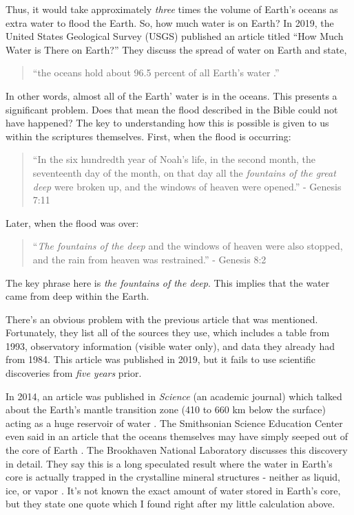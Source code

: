\documentclass[10pt]{article}
\begin{document}
\begin{multicols}{2}
Thus, it would take approximately \textit{three} times the volume of Earth's oceans as extra water to flood the Earth. So, how much water is on Earth? In 2019, the United States Geological Survey (USGS) published an article titled ``How Much Water is There on Earth?'' They discuss the spread of water on Earth and state,
\begin{quotation}
\noindent``the oceans hold about 96.5 percent of all Earth's water \cite{ocean water}.'' 
\end{quotation}
In other words, almost all of the Earth' water is in the oceans. This presents a significant problem. Does that mean the flood described in the Bible could not have happened? The key to understanding how this is possible is given to us within the scriptures themselves. First, when the flood is occurring:
\begin{quotation}
\noindent``In the six hundredth year of Noah’s life, in the second month, the seventeenth day of the month, on that day all the \textit{fountains of the great deep} were broken up, and the windows of heaven were opened.'' - Genesis 7:11
\end{quotation}
Later, when the flood was over:
\begin{quotation}
\noindent``\textit{The fountains of the deep} and the windows of heaven were also stopped, and the rain from heaven was restrained.'' - Genesis 8:2
\end{quotation}
The key phrase here is \textit{the fountains of the deep}. This implies that the water came from deep within the Earth.

There's an obvious problem with the previous article that was mentioned. Fortunately, they list all of the sources they use, which includes a table from 1993, observatory information (visible water only), and data they already had from 1984. This article was published in 2019, but it fails to use scientific discoveries from \textit{five years} prior.

In 2014, an article was published in \textit{Science} (an academic journal) which talked about the Earth's mantle transition zone (410 to 660 km below the surface) acting as a huge reservoir of water \cite{mantle water}. The Smithsonian Science Education Center even said in an article that the oceans themselves may have simply seeped out of the core of Earth \cite{ocean below feet}. The Brookhaven National Laboratory discusses this discovery in detail. They say this is a long speculated result where the water in Earth's core is actually trapped in the crystalline mineral structures - neither as liquid, ice, or vapor \cite{deep earth water}. It's not known the exact amount of water stored in Earth's core, but they state one quote which I found right after my little calculation above.


\end{multicols}
\end{document}
